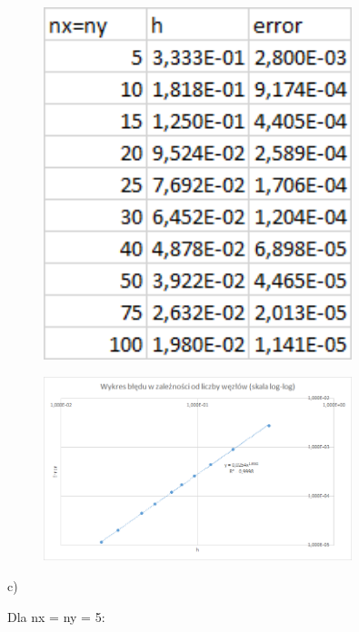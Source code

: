 \begin{figure}[!ht]
	\begin{center}
		\includegraphics[width=0.8\textwidth]{Lab5/charts/zad2/error_dane.png}
	\end{center}
\end{figure}

\begin{figure}[!ht]
	\begin{center}
		\includegraphics[width=0.8\textwidth]{Lab5/charts/zad2/error.png}
	\end{center}
\end{figure}

\newpage

c)

Dla nx = ny = 5:

